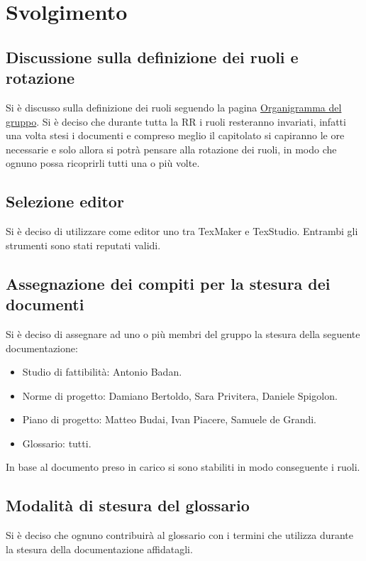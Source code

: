 \section*{Svolgimento}
\subsection*{Discussione sulla definizione dei ruoli e rotazione}
			Si è discusso sulla definizione dei ruoli seguendo la pagina
			\href{https://www.math.unipd.it/~tullio/IS-1/2020/Progetto/RO.html#Org}{Organigramma del gruppo}.
			Si è deciso che durante tutta la RR i ruoli resteranno invariati, infatti
			una volta stesi i documenti e compreso meglio il capitolato si capiranno le ore necessarie e solo allora si potrà pensare alla rotazione dei ruoli, in modo che ognuno possa ricoprirli tutti una o più volte. 

\subsection*{Selezione editor \glock{\LaTeX}}
			Si è deciso di utilizzare come editor \glock{\LaTeX} uno tra TexMaker e TexStudio.
			Entrambi gli strumenti sono stati reputati validi.
			


\subsection*{\hypertarget{thesentence}{Assegnazione dei compiti per la stesura dei documenti}}
			Si è deciso di assegnare ad uno o più membri del gruppo la stesura della seguente documentazione:
			\begin{itemize}
			\item Studio di fattibilità: Antonio Badan.
			\item Norme di progetto: Damiano Bertoldo, Sara Privitera, Daniele Spigolon.
			\item Piano di progetto: Matteo Budai, Ivan Piacere, Samuele de Grandi.
			\item Glossario: tutti.
			\end{itemize}
			In base al documento preso in carico si sono stabiliti in modo conseguente i ruoli.

\subsection*{Modalità di stesura del glossario}
		    Si è deciso che ognuno contribuirà al glossario con i termini che utilizza durante la stesura della documentazione affidatagli.

